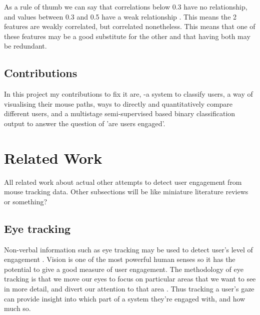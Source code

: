 \documentclass{article}
\begin{document}
As a rule of thumb we can say that correlations below 0.3 have no relationship, and values between 0.3 and 0.5 have a weak relationship \cite{mindrila2017scatterplots}.
This means the 2 features are weakly correlated, but correlated nonetheless.
This means that one of these features may be a good substitute for the other and that having both may be redundant.

\subsection{Contributions}

In this project my contributions to fix it are, -a system to classify users, a way of visualising their mouse paths, ways to directly and quantitatively compare different users, and a multistage semi-supervised based binary classification output to answer the question of 'are users engaged'.

\section{Related Work}


All related work about actual other attempts to detect user engagement from mouse tracking data.
Other subsections will be like miniature literature reviews or something?


\subsection{Eye tracking}

Non-verbal information such as eye tracking may be used to detect user’s level of engagement \cite{lala2017detection}.
Vision is one of the most powerful human senses so it has the potential to give a good measure of user engagement. 
The methodology of eye tracking is that we move our eyes to focus on particular areas that we want to see in more detail, and divert our attention to that area \cite{duchowski2007eye}. 
Thus tracking a user’s gaze can provide insight into which part of a system they’re engaged with, and how much so.
\end{document}
